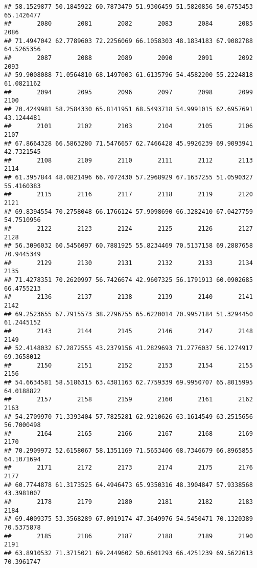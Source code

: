 \documentclass[
]{article}
\begin{document}
\begin{verbatim}
## 58.1529877 50.1845922 60.7873479 51.9306459 51.5820856 50.6753453 65.1426477 
##       2080       2081       2082       2083       2084       2085       2086 
## 71.4947042 62.7789603 72.2256069 66.1058303 48.1834183 67.9082788 64.5265356 
##       2087       2088       2089       2090       2091       2092       2093 
## 59.9008088 71.0564810 68.1497003 61.6135796 54.4582200 55.2224818 61.0821162 
##       2094       2095       2096       2097       2098       2099       2100 
## 70.4249981 58.2584330 65.8141951 68.5493718 54.9991015 62.6957691 43.1244481 
##       2101       2102       2103       2104       2105       2106       2107 
## 67.8664328 66.5863280 71.5476657 62.7466428 45.9926239 69.9093941 42.7321545 
##       2108       2109       2110       2111       2112       2113       2114 
## 61.3957844 48.0821496 66.7072430 57.2968929 67.1637255 51.0590327 55.4160383 
##       2115       2116       2117       2118       2119       2120       2121 
## 69.8394554 70.2758048 66.1766124 57.9098690 66.3282410 67.0427759 54.7510956 
##       2122       2123       2124       2125       2126       2127       2128 
## 56.3096032 60.5456097 60.7881925 55.8234469 70.5137158 69.2887658 70.9445349 
##       2129       2130       2131       2132       2133       2134       2135 
## 71.4278351 70.2620997 56.7426674 42.9607325 56.1791913 60.0902685 66.4755213 
##       2136       2137       2138       2139       2140       2141       2142 
## 69.2523655 67.7915573 38.2796755 65.6220014 70.9957184 51.3294450 61.2445152 
##       2143       2144       2145       2146       2147       2148       2149 
## 52.4148032 67.2872555 43.2379156 41.2829693 71.2776037 56.1274917 69.3658012 
##       2150       2151       2152       2153       2154       2155       2156 
## 54.6634581 58.5186315 63.4381163 62.7759339 69.9950707 65.8015995 64.0188822 
##       2157       2158       2159       2160       2161       2162       2163 
## 54.2709970 71.3393404 57.7825281 62.9210626 63.1614549 63.2515656 56.7000498 
##       2164       2165       2166       2167       2168       2169       2170 
## 70.2909972 52.6158067 58.1351169 71.5653406 68.7346679 66.8965855 64.1071694 
##       2171       2172       2173       2174       2175       2176       2177 
## 60.7744878 61.3173525 64.4946473 65.9350316 48.3904847 57.9338568 43.3981007 
##       2178       2179       2180       2181       2182       2183       2184 
## 69.4009375 53.3568289 67.0919174 47.3649976 54.5450471 70.1320389 70.5375878 
##       2185       2186       2187       2188       2189       2190       2191 
## 63.8910532 71.3715021 69.2449602 50.6601293 66.4251239 69.5622613 70.3961747 

\end{verbatim}
\end{document}
